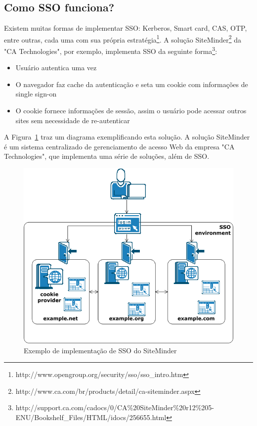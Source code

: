 \documentclass[11pt]{article}
\begin{document}

\subsection{Como SSO funciona?}

Existem muitas formas de implementar SSO: Kerberos, Smart card, CAS, OTP,
entre outras, cada uma com sua própria
estratégia\footnote{http://www.opengroup.org/security/sso/sso\_intro.htm}. A solução
SiteMinder\footnote{http://www.ca.com/br/products/detail/ca-siteminder.aspx}
da "CA Technologies", por exemplo, implementa SSO da seguinte
forma\footnote{http://support.ca.com/cadocs/0/CA\%20SiteMinder\%20r12\%205-ENU/Bookshelf\_Files/HTML/idocs/256655.html}:

\begin{itemize}
  \item{Usuário autentica uma vez}
  \item{O navegador faz cache da autenticação e seta um cookie com
        informações de single sign-on}
  \item{O cookie fornece informações de sessão, assim o usuário pode acessar
        outros sites sem necessidade de re-autenticar}
\end{itemize}

A Figura~\ref{fig:sso-siteminder} traz um diagrama exemplificando esta
solução. A solução SiteMinder é um sistema centralizado de gerenciamento de
acesso Web da empresa "CA Technologies", que implementa uma série de soluções,
além de SSO.

\begin{figure}[h]
\center
\includegraphics[scale=0.6]{sso-siteminder.png}
\caption{Exemplo de implementação de SSO do SiteMinder}
\label{fig:sso-siteminder}
\end{figure}
\end{document}

